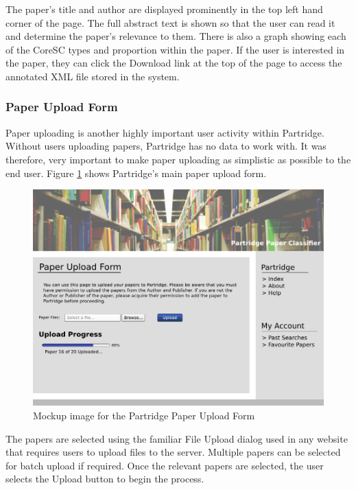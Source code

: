 The paper's title and author are displayed prominently in the top left hand
corner of the page. The full abstract text is shown so that the user can read
it and determine the paper's relevance to them. There is also a graph showing
each of the CoreSC types and proportion within the paper. If the user is
interested in the paper, they can click the Download link at the top of the
page to access the annotated XML file stored in the system.

\subsubsection{Paper Upload Form}
Paper uploading is another highly important user activity within Partridge.
Without users uploading papers, Partridge has no data to work with. It was
therefore, very important to make paper uploading as simplistic as possible to
the end user. Figure \ref{fig:paper_upload} shows Partridge's main paper upload
form. 

\begin{figure}[!htb]
\vspace{5mm}
\centering
\includegraphics[width=\textwidth]{images/design/upload_mockup.png}
\caption{Mockup image for the Partridge Paper Upload Form}
\label{fig:paper_upload}
\end{figure}

The papers are selected using the familiar File Upload dialog used in any
website that requires users to upload files to the server. Multiple papers can
be selected for batch upload if required. Once the relevant papers are
selected, the user selects the Upload button to begin the process. 

